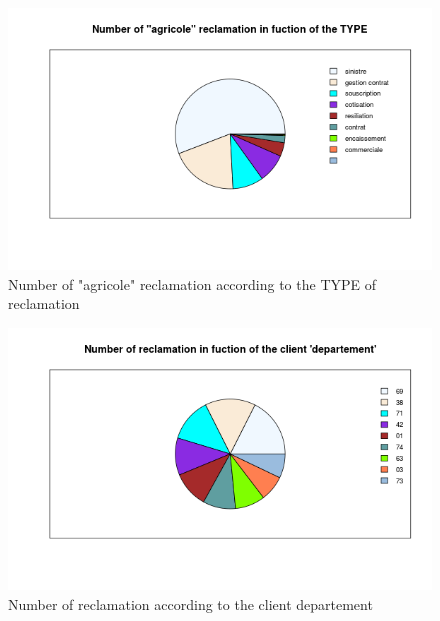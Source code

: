 \documentclass[a4paper, 11pt]{article}
\begin{document}
        \begin{figure}[!ht]
        	\centering
                \includegraphics[height = 10 cm]{Valentin/Number_of_agricole_reclamation_in_fuction_of_the_TYPE.png}
                \caption{Number of "agricole" reclamation according to the TYPE of reclamation}
                \label{fig:reclamtion_agri}
        \end{figure}
        
        \begin{figure}[!ht]
        	\centering
                \includegraphics[height = 10 cm]{Valentin/Number_of_reclamation_in_fuction_of_the_client_departement.png}
                \caption{Number of reclamation according to the client departement}
                \label{fig:reclamtion_dep1}
        \end{figure}
        
\end{document}
